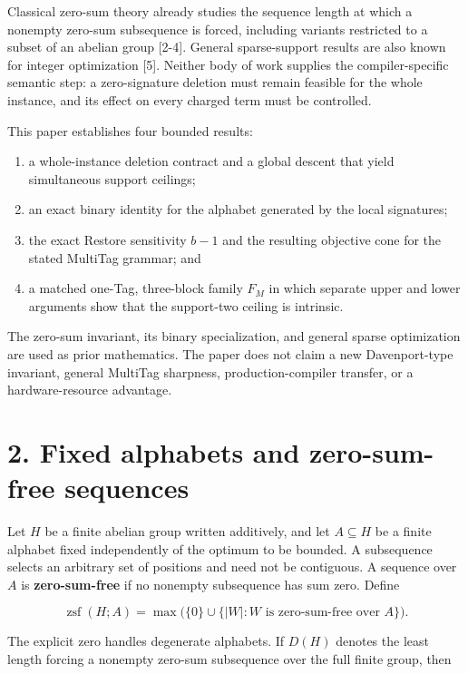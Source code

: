 \documentclass[11pt]{article}
\providecommand{\tightlist}{\setlength{\itemsep}{0pt}\setlength{\parskip}{0pt}}
\begin{document}
Classical zero-sum theory already studies the sequence length at which a nonempty zero-sum subsequence is forced, including variants restricted to a subset of an abelian group {[}2-4{]}. General sparse-support results are also known for integer optimization {[}5{]}. Neither body of work supplies the compiler-specific semantic step: a zero-signature deletion must remain feasible for the whole instance, and its effect on every charged term must be controlled.

This paper establishes four bounded results:

\begin{enumerate}
\def\labelenumi{\arabic{enumi}.}
\tightlist
\item
  a whole-instance deletion contract and a global descent that yield simultaneous support ceilings;
\item
  an exact binary identity for the alphabet generated by the local signatures;
\item
  the exact Restore sensitivity \(b-1\) and the resulting objective cone for the stated MultiTag grammar; and
\item
  a matched one-Tag, three-block family \(F_M\) in which separate upper and lower arguments show that the support-two ceiling is intrinsic.
\end{enumerate}

The zero-sum invariant, its binary specialization, and general sparse optimization are used as prior mathematics. The paper does not claim a new Davenport-type invariant, general MultiTag sharpness, production-compiler transfer, or a hardware-resource advantage.

\hypertarget{fixed-alphabets-and-zero-sum-free-sequences}{%
\section*{2. Fixed alphabets and zero-sum-free sequences}\label{fixed-alphabets-and-zero-sum-free-sequences}}

Let \(H\) be a finite abelian group written additively, and let \(A\subseteq H\) be a finite alphabet fixed independently of the optimum to be bounded. A subsequence selects an arbitrary set of positions and need not be contiguous. A sequence over \(A\) is \textbf{zero-sum-free} if no nonempty subsequence has sum zero. Define

\[
\operatorname{zsf}(H;A)
=
\max\bigl(\{0\}\cup\{|W|:W\text{ is zero-sum-free over }A\}\bigr).
\]

The explicit zero handles degenerate alphabets. If \(D(H)\) denotes the least length forcing a nonempty zero-sum subsequence over the full finite group, then
\end{document}
